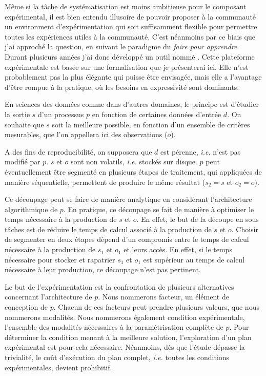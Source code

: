 Même si la tâche de systématisation est moins ambitieuse pour le composant expérimental, il est bien entendu illusoire de pouvoir proposer à la communauté un environment d'expérimentation qui soit suffisamment flexible pour permettre toutes les expériences utiles à la communauté. C'est néanmoins par ce biais que j'ai approché la question, en suivant le paradigme du \textsl{faire pour apprendre}. Durant plusieurs années j'ai donc développé un outil nommé . Cette plateforme expérimentale est basée sur une formalisation que je présenterai ici. Elle n'est probablement pas la plus élégante qui puisse être envisagée, mais elle a l'avantage d'être rompue à la pratique, où les besoins en expressivité sont dominants.



En sciences des données comme dans d'autres domaines, le principe est d'étudier la sortie $s$ d'un processus $p$ en fonction de certaines données d'entrée $d$. On souhaite que $s$ soit la meilleure possible, en fonction d'un ensemble de critères mesurables, que l'on appellera ici des \textsf
{observations} ($o$).

A des fins de reproducibilité, on supposera que $d$ est pérenne, \textit{i.e.} n'est pas modifié par $p$. $s$ et $o$ sont non volatils, \textit{i.e.} stockés sur disque. $p$ peut éventuellement être segmenté en plusieurs étapes de traitement, qui appliquées de manière séquentielle, permettent de produire le même résultat ($s_2=s$ et $o_2=o$).



Ce découpage peut se faire de manière analytique en considérant l'architecture algorithmique de $p$. En pratique, ce découpage se fait de manière à optimiser le temps nécessaire à la production de $s$ et $o$. En effet, le but de la découpe en sous tâches est de réduire le temps de calcul associé à la production de $s$ et $o$. Choisir de segmenter en deux étapes dépend d'un compromis entre le temps de calcul nécessaire à la production de $s_1$ et $o_1$ et leurs accès. En effet, si le temps nécessaire pour stocker et rapatrier $s_1$ et $o_1$ est supérieur au temps de calcul nécessaire à leur production, ce découpage n'est pas pertinent.

Le but de l'expérimentation est la confrontation de plusieurs alternatives concernant l'architecture de $p$. Nous nommerons \textsf{facteur}, un élément de conception de $p$. Chacun de ces facteurs peut prendre plusieurs valeurs, que nous nommerons \textsf{modalités}. Nous nommerons également \textsf
{condition expérimentale}, l'ensemble des modalités nécessaires à la  paramétrisation complète de $p$. Pour déterminer la condition menant à la meilleure solution, l'exploration d'un plan expérimental est pour cela nécessaire. Néanmoins, dès que l'étude dépasse la trivialité, le coût d'exécution du plan complet, \textit{i.e.} toutes les conditions expérimentales, devient prohibitif.

